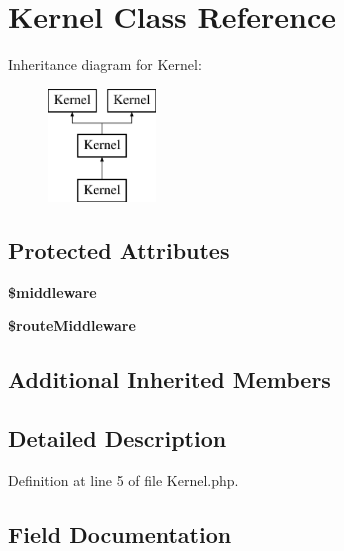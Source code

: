 \section{Kernel Class Reference}
\label{class_app_1_1_http_1_1_kernel}
Inheritance diagram for Kernel\+:\begin{figure}[H]
\begin{center}
\leavevmode
\includegraphics[height=3.000000cm]{class_app_1_1_http_1_1_kernel}
\end{center}
\end{figure}
\subsection*{Protected Attributes}
\begin{DoxyCompactItemize}
\item 
{\bf \$middleware}
\item 
{\bf \$route\+Middleware}
\end{DoxyCompactItemize}
\subsection*{Additional Inherited Members}


\subsection{Detailed Description}


Definition at line 5 of file Kernel.\+php.



\subsection{Field Documentation}
